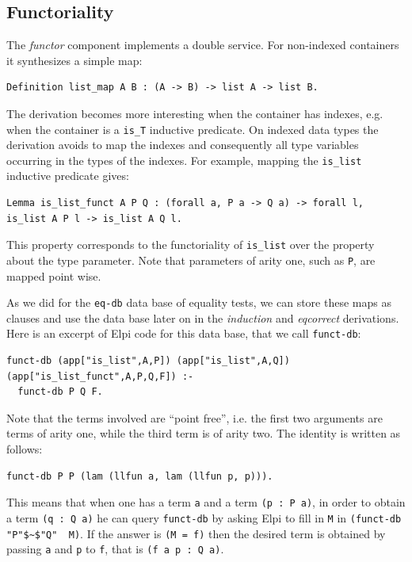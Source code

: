 \documentclass[a4paper,UKenglish,cleveref, autoref]{lipics-v2019}
\newcommand{\derive}[1]{\emph{#1}}
\begin{document}
\subsection{Functoriality} %

The \derive{functor} component implements a double service.
For non-indexed containers it synthesizes a simple map:
\begin{lstlisting}
Definition list_map A B : (A -> B) -> list A -> list B.
\end{lstlisting}

\noindent
The derivation becomes more interesting when the container has indexes,
e.g. when the container is a \lstinline+is_T+ inductive predicate.
On indexed data types the derivation avoids to map the indexes and
consequently all type variables occurring in the types of the indexes.
For example, mapping the \lstinline+is_list+ inductive predicate gives:
\begin{lstlisting}
Lemma is_list_funct A P Q : (forall a, P a -> Q a) -> forall l, is_list A P l -> is_list A Q l.
\end{lstlisting}

\noindent
This property corresponds to the functoriality of \lstinline+is_list+
over the property about the type parameter. Note that parameters of
arity one, such as \lstinline+P+, are mapped point wise.

As we did for the \lstinline+eq-db+ data base of equality tests, we
can store these maps as clauses and use the data base later on in the
\derive{induction} and \derive{eqcorrect} derivations.
Here is an excerpt of Elpi code for this data base, that we call
\lstinline+funct-db+:
\begin{lstlisting}[]
funct-db (app["is_list",A,P]) (app["is_list",A,Q]) (app["is_list_funct",A,P,Q,F]) :-
  funct-db P Q F.
\end{lstlisting}

\noindent
Note that the terms involved are ``point free'', i.e.
the first two arguments are terms of arity one, while
the third term is of arity two. %
The identity is written as follows:
\begin{lstlisting}[]
funct-db P P (lam (llfun a, lam (llfun p, p))).
\end{lstlisting}

\noindent
This means that when one has a term \lstinline+a+
and a term \lstinline+(p : P a)+, in order to
obtain a term \lstinline+(q : Q a)+ he can
query \lstinline+funct-db+ by asking Elpi
to fill in \lstinline+M+ in \lstinline+(funct-db "P"$~$"Q"  M)+.
If the answer is \lstinline+(M = f)+ then
the desired term is
obtained by passing
\lstinline+a+ and \lstinline+p+ to \lstinline+f+, that is
\lstinline+(f a p : Q a)+.
\end{document}
